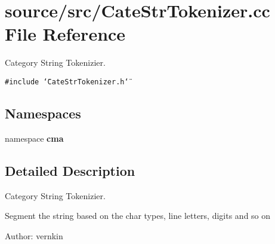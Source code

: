 \section{source/src/CateStrTokenizer.cc File Reference}
\label{CateStrTokenizer_8cc}
Category String Tokenizier. 

{\tt \#include \char`\"{}CateStrTokenizer.h\char`\"{}}\par
\subsection*{Namespaces}
\begin{CompactItemize}
\item 
namespace \textbf{cma}
\end{CompactItemize}


\subsection{Detailed Description}
Category String Tokenizier. 

Segment the string based on the char types, line letters, digits and so on

\begin{Desc}
\item[Author:]vernkin \end{Desc}
